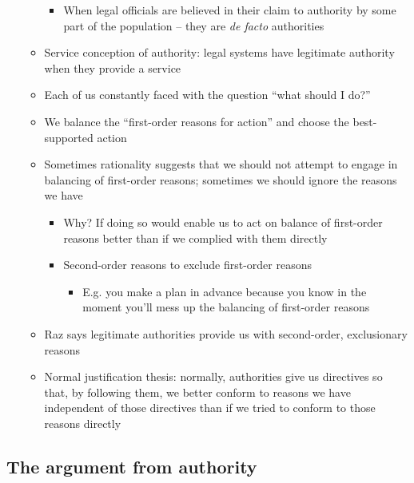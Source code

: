 \begin{itemize}
\begin{itemize}
    \begin{itemize}
    \tightlist
    \item
      When legal officials are believed in their claim to authority by
      some part of the population -- they are \emph{de facto}
      authorities
    \end{itemize}
  \item
    Service conception of authority: legal systems have legitimate
    authority when they provide a service
  \item
    Each of us constantly faced with the question ``what should I do?''
  \item
    We balance the ``first-order reasons for action'' and choose the
    best-supported action
  \item
    Sometimes rationality suggests that we should not attempt to engage
    in balancing of first-order reasons; sometimes we should ignore the
    reasons we have

    \begin{itemize}
    \tightlist
    \item
      Why? If doing so would enable us to act on balance of first-order
      reasons better than if we complied with them directly
    \item
      Second-order reasons to exclude first-order reasons

      \begin{itemize}
      \tightlist
      \item
        E.g. you make a plan in advance because you know in the moment
        you'll mess up the balancing of first-order reasons
      \end{itemize}
    \end{itemize}
  \item
    Raz says legitimate authorities provide us with second-order,
    exclusionary reasons
  \item
    Normal justification thesis: normally, authorities give us
    directives so that, by following them, we better conform to reasons
    we have independent of those directives than if we tried to conform
    to those reasons directly
  \end{itemize}
\end{itemize}

\hypertarget{the-argument-from-authority}{%
\subsection{The argument from
authority}\label{the-argument-from-authority}}

